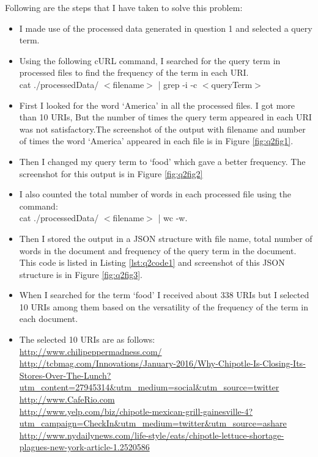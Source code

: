 Following are the steps that I have taken to solve this problem:
\begin{itemize}
\item I made use of the processed data generated in question 1 and selected a query term.\\
\item Using the following cURL command, I searched for the query term in processed files to find the frequency of the term in each URI.\\
cat ./processedData/ $<$filename$>$ | grep -i -c $<$queryTerm$>$
\item First I looked for the word `America' in all the processed files. I got more than 10 URIs, But the number of times the query term appeared in each URI was not satisfactory.The screenshot of the output with filename and number of times the word `America' appeared in each file is in Figure \ref{fig:q2fig1}.
\item Then I changed my query term to `food' which gave a better frequency. The screenshot for this output is in Figure \ref{fig:q2fig2}
\item I also counted the total number of words in each processed file using the command:\\
cat ./processedData/ $<$filename$>$ | wc -w. 
\item Then I stored the output in a JSON structure with file name, total number of words in the document and frequency of the query term in the document. This code is listed in Listing \ref{lst:q2code1} and screenshot of this JSON structure is in Figure \ref{fig:q2fig3}.
\item When I searched for the term `food' I received about 338 URIs but I selected 10 URIs among them based on the versatility of the frequency of the term in each document.
\item The selected 10 URIs are as follows:\\
{\url{http://www.chilipeppermadness.com/}}\\
{\url{http://tcbmag.com/Innovations/January-2016/Why-Chipotle-Is-Closing-Its-Stores-Over-The-Lunch?utm_content=27945314&utm_medium=social&utm_source=twitter}}\\
{\url{http://www.CafeRio.com }}\\
{\url{http://www.yelp.com/biz/chipotle-mexican-grill-gainesville-4?utm_campaign=CheckIn&utm_medium=twitter&utm_source=ashare}}\\
{\url{http://www.nydailynews.com/life-style/eats/chipotle-lettuce-shortage-plagues-new-york-article-1.2520586}}\\

\end{itemize}

